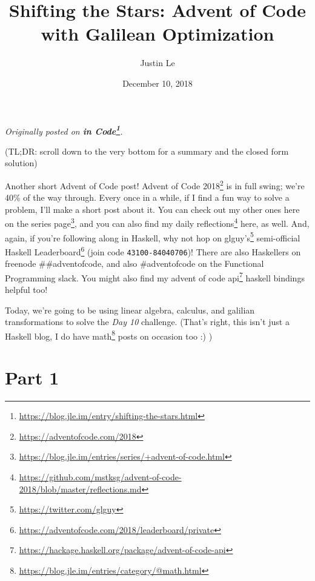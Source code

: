 \documentclass[]{article}
\title{Shifting the Stars: Advent of Code with Galilean Optimization}
\author{Justin Le}
\date{December 10, 2018}
\renewcommand{\href}[2]{#2\footnote{\url{#1}}}
\begin{document}
\maketitle

\emph{Originally posted on
\textbf{\href{https://blog.jle.im/entry/shifting-the-stars.html}{in Code}}.}

(TL;DR: scroll down to the very bottom for a summary and the closed form
solution)

Another short Advent of Code post! \href{https://adventofcode.com/2018}{Advent
of Code 2018} is in full swing; we're 40\% of the way through. Every once in a
while, if I find a fun way to solve a problem, I'll make a short post about it.
You can check out my other ones
\href{https://blog.jle.im/entries/series/+advent-of-code.html}{here on the
series page}, and you can also find my
\href{https://github.com/mstksg/advent-of-code-2018/blob/master/reflections.md}{daily
reflections} here, as well. And, again, if you're following along in Haskell,
why not hop on \href{https://twitter.com/glguy}{glguy's} semi-official
\href{https://adventofcode.com/2018/leaderboard/private}{Haskell Leaderboard}
(join code \texttt{43100-84040706})! There are also Haskellers on freenode
\#\#adventofcode, and also \#adventofcode on the Functional Programming slack.
You might also find my
\href{https://hackage.haskell.org/package/advent-of-code-api}{advent of code
api} haskell bindings helpful too!

Today, we're going to be using linear algebra, calculus, and galilian
transformations to solve the \emph{Day 10} challenge. (That's right, this isn't
just a Haskell blog, I do have
\href{https://blog.jle.im/entries/category/@math.html}{math} posts on occasion
too :) )

\hypertarget{part-1}{%
\section{Part 1}\label{part-1}}
\end{document}

